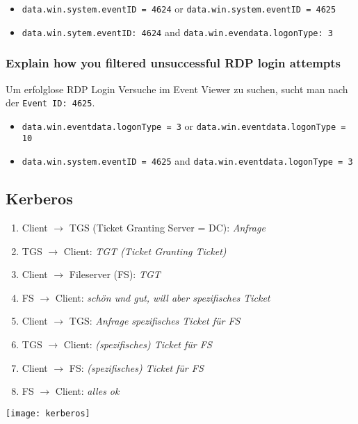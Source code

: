 \begin{itemize}
    \item \lstinline|data.win.system.eventID = 4624| or \lstinline|data.win.system.eventID = 4625|
    \item \lstinline|data.win.sytem.eventID: 4624| and \lstinline|data.win.evendata.logonType: 3|
\end{itemize}

\subsubsection{Explain how you filtered unsuccessful RDP login attempts}
Um erfolglose RDP Login Versuche im Event Viewer zu suchen, sucht man nach der \lstinline|Event ID: 4625|.\\

\begin{itemize}
    \item \lstinline|data.win.eventdata.logonType = 3| or \lstinline|data.win.eventdata.logonType = 10|
    \item \lstinline|data.win.system.eventID = 4625| and \lstinline|data.win.eventdata.logonType = 3|
\end{itemize}

\subsection{Kerberos}
\begin{minipage}{0.45\linewidth}
    \begin{enumerate}
        \item Client $\rightarrow$ TGS (Ticket Granting Server = DC): \textit{Anfrage}
        \item TGS $\rightarrow$ Client: \textit{TGT (Ticket Granting Ticket)}
        \item Client $\rightarrow$ Fileserver (FS): \textit{TGT}
        \item FS $\rightarrow$ Client: \textit{schön und gut, will aber spezifisches Ticket}
        \item Client $\rightarrow$ TGS: \textit{Anfrage spezifisches Ticket für FS}
        \item TGS $\rightarrow$ Client: \textit{(spezifisches) Ticket für FS}
        \item Client $\rightarrow$ FS: \textit{(spezifisches) Ticket für FS}
        \item FS $\rightarrow$ Client: \textit{alles ok}
    \end{enumerate}
\end{minipage}
\begin{minipage}{0.5\linewidth}
    \begin{center}
        \texttt{[image: kerberos]}
        \vspace{-8pt}
    \end{center}
\end{minipage}



